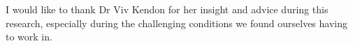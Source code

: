 \begin{acknowledgements}
    I would like to thank Dr Viv Kendon for her insight and advice during this research, especially during the challenging conditions we found ourselves having to work in.
\end{acknowledgements}